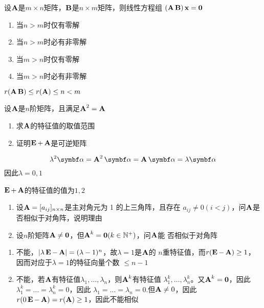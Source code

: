 \documentclass{article}
\begin{document}
\begin{examplle}[]
设\(\bA\)是\(m\times n\)矩阵，\(\bB\)是\(n\times m\)矩阵，则线性方程组
\((\bA\bB)\bx=\bzero\)
\begin{enumerate}
\item 当\(n>m\)时仅有零解
\item 当\(n>m\)时必有非零解
\item 当\(m>n\)时仅有零解
\item 当\(m>n\)时必有非零解
\end{enumerate}


\(r(\bA\bB)\le r(\bA)\le n<m\)
\end{examplle}

\begin{examplle}[]
设\(\bA\)是\(n\)阶矩阵，且满足\(\bA^2=\bA\)
\begin{enumerate}
\item 求\(\bA\)的特征值的取值范围
\item 证明\(\bE+\bA\)是可逆矩阵
\end{enumerate}


\begin{equation*}
\lambda^2\balpha=\bA^2\balpha=\bA\balpha=\lambda\balpha
\end{equation*}
因此\(\lambda=0,1\)

\(\bE+\bA\)的特征值的值为\(1,2\)
\end{examplle}

\begin{examplle}[]
\begin{enumerate}
\item 设\(\bA=[a_{ij}]_{n\times n}\)是主对角元为 1 的上三角阵，且存在
\(a_{ij}\neq0(i<j)\)，问\(\bA\)是否相似于对角阵，说明理由
\item 设\(n\)阶矩阵\(\bA\neq\bzero\)，但\(\bA^k=\bzero(k\in\N^+)\)，问\(\bA\)能
否相似于对角阵
\end{enumerate}


\begin{enumerate}
\item 不能，\(\abs{\lambda\bE-\bA}=(\lambda-1)^n\)，故\(\lambda=1\)是\(\bA\)的
\(n\)重特征值，而\(r(\bE-\bA)\ge1\)，因而对应于\(\lambda=1\)的特征向量个数
\(\le n-1\)
\item 不能，若\(\bA\)有特征值\(\lambda_1,\dots,\lambda_n\)，则\(\bA^k\)有特征值
\(\lambda_1^k,\dots,\lambda_n^k\)。又\(\bA^k=\bzero\)，因此
\(\lambda_1^k=\dots=\lambda_n^k=0\)，因此
\(\lambda_1=\dots=\lambda_n=0\).但\(\bA\neq0\)，因此
\(r(0\bE-\bA)=r(\bA)\ge1\)，因此不能相似
\end{enumerate}
\end{examplle}
\end{document}
